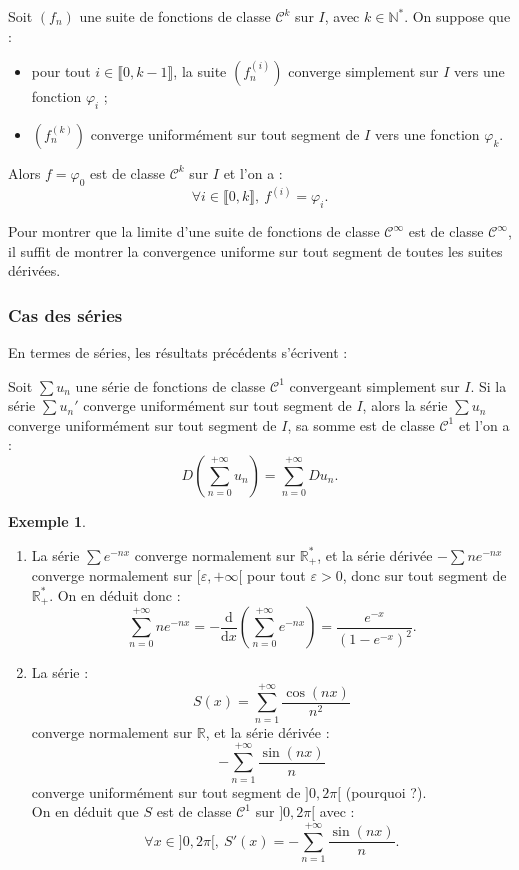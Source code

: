 \documentclass[french]{article}
\newcommand{\N}{\mathbb{N}}
\newcommand{\R}{\mathbb{R}}
\newcommand{\st}{^*}
\renewcommand{\d}{\text{d}}
\theoremstyle{plain}
\theoremstyle{definition}
\newtheorem*{ex}{Exemple}
\theoremstyle{remark}
\begin{document}
\begin{cor}%
	Soit $(f_n)$ une suite de fonctions de classe $\mathcal{C}^k$ sur $I$, avec $k\in\N\st$. On suppose que :
	\begin{itemize}
		\item pour tout $i\in\llbracket0,k-1\rrbracket$, la suite $(f_n^{(i)})$ converge simplement sur $I$ vers une fonction $\varphi_i$ ;
		\item $(f_n^{(k)})$ converge uniformément sur tout segment de $I$ vers une fonction $\varphi_k$.
	\end{itemize}
	Alors $f=\varphi_0$ est de classe $\mathcal{C}^k$ sur $I$ et l'on a :
	$$\forall i\in\llbracket0,k\rrbracket,\ f^{(i)}=\varphi_i.$$
\end{cor}

\begin{met}
	Pour montrer que la limite d'une suite de fonctions de classe $\mathcal{C}^\infty$ est de classe $\mathcal{C}^\infty$, il suffit de montrer la convergence uniforme sur tout segment de toutes les suites dérivées.
\end{met}

\subsubsection*{Cas des séries}

En termes de séries, les résultats précédents s'écrivent :

\begin{thm}%
	Soit $\displaystyle\sum u_n$ une série de fonctions de classe $\mathcal{C}^1$ convergeant simplement sur $I$. Si la série $\displaystyle\sum u_n'$ converge uniformément sur tout segment de $I$, alors la série $\displaystyle\sum u_n$ converge uniformément sur tout segment de $I$, sa somme est de classe $\mathcal{C}^1$ et l'on a :
	$$D\left(\sum_{n=0}^{+\infty}u_n\right)=\sum_{n=0}^{+\infty}Du_n.$$
\end{thm}

\begin{ex}
	\begin{enumerate}
		\item La série $\displaystyle\sum e^{-nx}$ converge normalement sur $\R_+\st$, et la série dérivée $\displaystyle-\sum ne^{-nx}$ converge normalement sur $[\varepsilon,+\infty[$ pour tout $\varepsilon>0$, donc sur tout segment de $\R_+\st$. On en déduit donc :
		$$\sum_{n=0}^{+\infty}ne^{-nx}=-\frac{\d}{\d x}\left(\sum_{n=0}^{+\infty}e^{-nx}\right)=\frac{e^{-x}}{(1-e^{-x})^2}.$$
		\item La série :
		$$S(x)=\sum_{n=1}^{+\infty}\frac{\cos(nx)}{n^2}$$ converge normalement sur $\R$, et la série dérivée :
		$$-\sum_{n=1}^{+\infty}\frac{\sin(nx)}{n}$$
		converge uniformément sur tout segment de $]0,2\pi[$ (pourquoi ?). \\
		On en déduit que $S$ est de classe $\mathcal{C}^1$ sur $]0,2\pi[$ avec :
		$$\forall x\in]0,2\pi[,\ S'(x)=-\sum_{n=1}^{+\infty}\frac{\sin(nx)}{n}.$$
	\end{enumerate}
\end{ex}
\end{document}
